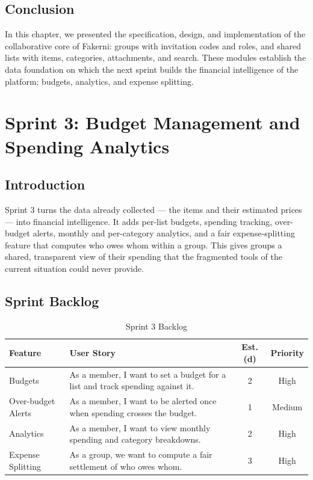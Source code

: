 \documentclass[12pt,a4paper,oneside]{report}
\begin{document}
\section{Conclusion}
In this chapter, we presented the specification, design, and implementation of the
collaborative core of Fakerni: groups with invitation codes and roles, and shared
lists with items, categories, attachments, and search. These modules establish the
data foundation on which the next sprint builds the financial intelligence of the
platform: budgets, analytics, and expense splitting.

\chapter{Sprint 3: Budget Management and Spending Analytics}

\section{Introduction}
Sprint 3 turns the data already collected --- the items and their estimated prices
--- into financial intelligence. It adds per-list budgets, spending tracking,
over-budget alerts, monthly and per-category analytics, and a fair
expense-splitting feature that computes who owes whom within a group. This gives
groups a shared, transparent view of their spending that the fragmented tools of
the current situation could never provide.

\section{Sprint Backlog}
\begin{table}[H]\centering
\caption{Sprint 3 Backlog}
\renewcommand{\arraystretch}{1.3}
\begin{tabularx}{\textwidth}{|p{3.2cm}|X|c|c|}
\hline
\textbf{Feature} & \textbf{User Story} & \textbf{Est. (d)} & \textbf{Priority} \\ \hline
Budgets & As a member, I want to set a budget for a list and track spending against it. & 2 & High \\ \hline
Over-budget Alerts & As a member, I want to be alerted once when spending crosses the budget. & 1 & Medium \\ \hline
Analytics & As a member, I want to view monthly spending and category breakdowns. & 2 & High \\ \hline
Expense Splitting & As a group, we want to compute a fair settlement of who owes whom. & 3 & High \\ \hline
\end{tabularx}
\renewcommand{\arraystretch}{1}
\end{table}
\end{document}
